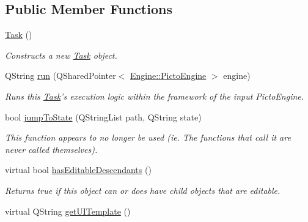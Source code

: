 \subsection*{Public Member Functions}
\begin{DoxyCompactItemize}
\item 
\hyperlink{class_picto_1_1_task_aa0da741a30dd188617708d7d65986259}{Task} ()
\begin{DoxyCompactList}\small\item\em Constructs a new \hyperlink{class_picto_1_1_task}{Task} object. \end{DoxyCompactList}\item 
Q\-String \hyperlink{class_picto_1_1_task_ab5ae1c377b52b5338fb3d82e0ce3bcbe}{run} (Q\-Shared\-Pointer$<$ \hyperlink{class_picto_1_1_engine_1_1_picto_engine}{Engine\-::\-Picto\-Engine} $>$ engine)
\begin{DoxyCompactList}\small\item\em Runs this \hyperlink{class_picto_1_1_task}{Task}'s execution logic within the framework of the input Picto\-Engine. \end{DoxyCompactList}\item 
bool \hyperlink{class_picto_1_1_task_a145629630f680070d2e130f00905c59f}{jump\-To\-State} (Q\-String\-List path, Q\-String state)
\begin{DoxyCompactList}\small\item\em This function appears to no longer be used (ie. The functions that call it are never called themselves). \end{DoxyCompactList}\item 
virtual bool \hyperlink{class_picto_1_1_task_ad82385f0878e842d564207eca4f0a48c}{has\-Editable\-Descendants} ()
\begin{DoxyCompactList}\small\item\em Returns true if this object can or does have child objects that are editable. \end{DoxyCompactList}\item 
\hypertarget{class_picto_1_1_task_ac93fdf2f524c7a3627b8aef2685d6c9c}{virtual Q\-String \hyperlink{class_picto_1_1_task_ac93fdf2f524c7a3627b8aef2685d6c9c}{get\-U\-I\-Template} ()}\label{class_picto_1_1_task_ac93fdf2f524c7a3627b8aef2685d6c9c}


\end{DoxyCompactItemize}

